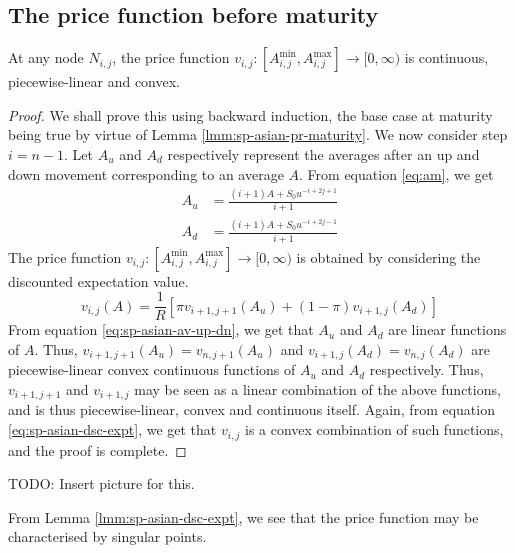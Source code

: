 \subsection{The price function before maturity}
\label{subsec:sp-asian-eu-price-gen}

\begin{lmm}
	\label{lmm:sp-asian-dsc-expt}
	At any node $ N_{i,j} $, the price function $ v_{i,j}: \left[ A_{i,j}^{\min}, A_{i,j}^{\max} \right] \to [0, \infty) $ is continuous, piecewise-linear and convex.
\end{lmm}

\begin{proof}
	We shall prove this using backward induction, the base case at maturity being true by virtue of Lemma \ref{lmm:sp-asian-pr-maturity}.
	We now consider step $ i = n-1 $. Let $A_u$ and $A_d$ respectively represent the averages after an up and down movement corresponding to an average $A$. From equation \ref{eq:am}, we get
	\begin{subequations}
		\label{eq:sp-asian-av-up-dn}
		\begin{align}
			A_u &= \frac{ (i+1) A + S_0 u^{-i+2j+1} }{ i+1 } \\
			A_d &= \frac{ (i+1) A + S_0 u^{-i+2j-1} }{ i+1 }
		\end{align}
	\end{subequations}
	The price function $ v_{i,j}: \left[ A_{i,j}^{\min}, A_{i,j}^{\max} \right] \to [0, \infty) $ is obtained by considering the discounted expectation value.
	\begin{equation}
		\label{eq:sp-asian-dsc-expt}
		v_{i,j}(A) = \frac{1}{R} \left[ \pi v_{i+1,j+1}(A_u) + (1 - \pi) v_{i+1,j}(A_d) \right]
	\end{equation}
	From equation \ref{eq:sp-asian-av-up-dn}, we get that $A_u$ and $A_d$ are linear functions of $A$. Thus, $ v_{i+1,j+1}(A_u) = v_{n,j+1}(A_u)$ and $ v_{i+1,j}(A_d) = v_{n,j}(A_d) $ are piecewise-linear convex continuous functions of $A_u$ and $A_d$ respectively. Thus, $ v_{i+1,j+1} $ and $ v_{i+1,j} $ may be seen as a linear combination of the above functions, and is thus piecewise-linear, convex and continuous itself. Again, from equation \ref{eq:sp-asian-dsc-expt}, we get that $v_{i,j}$ is a convex combination of such functions, and the proof is complete.
\end{proof}
TODO: Insert picture for this.


\begin{rem}
	From Lemma \ref{lmm:sp-asian-dsc-expt}, we see that the price function may be characterised by singular points.
\end{rem}



